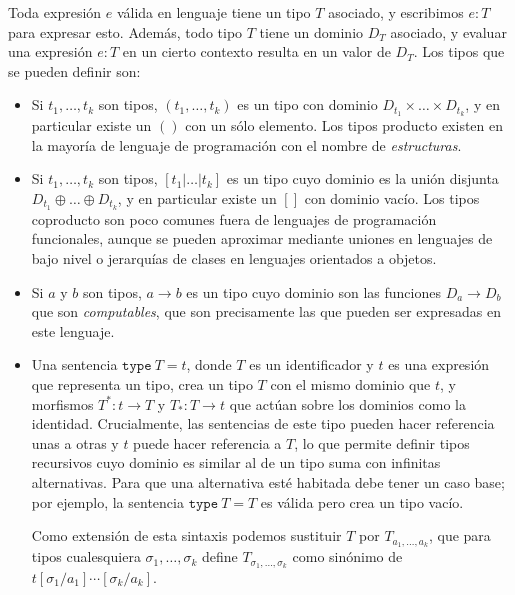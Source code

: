 Toda expresión $e$ válida en lenguaje tiene un tipo $T$ asociado, y escribimos
$e:T$ para expresar esto. Además, todo tipo $T$ tiene un dominio $D_T$ asociado,
y evaluar una expresión $e:T$ en un cierto contexto resulta en un valor de
$D_T$. Los tipos que se pueden definir son:
\begin{itemize}
\item {} Si $t_1,\dots,t_k$ son tipos, $(t_1,\dots,t_k)$ es
  un tipo con dominio $D_{t_1}\times\dots\times D_{t_k}$, y en particular existe
  un  $()$ con un sólo elemento. Los tipos producto existen en
  la mayoría de lenguaje de programación con el nombre de \emph{estructuras}.
\item {} Si $t_1,\dots,t_k$ son tipos, $[t_1|\dots|t_k]$ es un
  tipo cuyo dominio es la unión disjunta $D_{t_1}\oplus\dots\oplus D_{t_k}$, y
  en particular existe un  $[]$ con dominio vacío. Los tipos
  coproducto son poco comunes fuera de lenguajes de programación funcionales,
  aunque se pueden aproximar mediante uniones en lenguajes de bajo nivel o
  jerarquías de clases en lenguajes orientados a objetos.
\item {} Si $a$ y $b$ son tipos, $a\to b$ es un tipo cuyo
  dominio son las funciones $D_a\to D_b$ que son \emph{computables}, que son
  precisamente las que pueden ser expresadas en este lenguaje.
\item {} Una sentencia $\mathtt{type\ }T=t$, donde $T$ es un
  identificador y $t$ es una expresión que representa un tipo, crea un tipo $T$
  con el mismo dominio que $t$, y morfismos $T^*:t\to T$ y $T_*:T\to t$ que
  actúan sobre los dominios como la identidad.  Crucialmente, las sentencias de
  este tipo pueden hacer referencia unas a otras y $t$ puede hacer referencia a
  $T$, lo que permite definir tipos recursivos cuyo dominio es similar al de un
  tipo suma con infinitas alternativas. Para que una alternativa esté habitada
  debe tener un caso base; por ejemplo, la sentencia $\mathtt{type\ }T=T$ es
  válida pero crea un tipo vacío.

  Como extensión de esta sintaxis podemos sustituir $T$ por $T_{a_1,\dots,a_k}$,
  que para tipos cualesquiera $\sigma_1,\dots,\sigma_k$ define
  $T_{\sigma_1,\dots,\sigma_k}$ como sinónimo de
  $t[\sigma_1/a_1]\cdots[\sigma_k/a_k]$.
\end{itemize}

